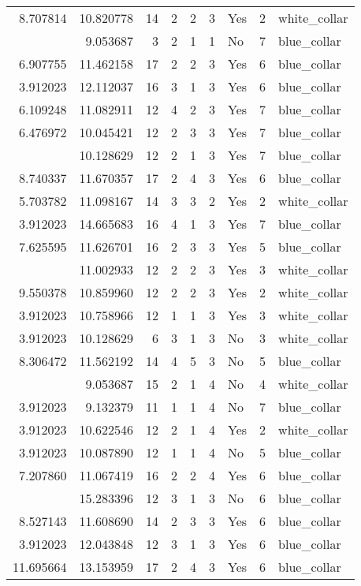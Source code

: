\documentclass[
]{article}
\begin{document}
\begin{longtable}[t]{rrrrrllrl}
8.707814 & 10.820778 & 14 & 2 & 2 & 3 & Yes & 2 & white\_collar\\
\addlinespace
3.912023 & 9.053687 & 3 & 2 & 1 & 1 & No & 7 & blue\_collar\\
6.907755 & 11.462158 & 17 & 2 & 2 & 3 & Yes & 6 & blue\_collar\\
3.912023 & 12.112037 & 16 & 3 & 1 & 3 & Yes & 6 & blue\_collar\\
6.109248 & 11.082911 & 12 & 4 & 2 & 3 & Yes & 7 & blue\_collar\\
6.476972 & 10.045421 & 12 & 2 & 3 & 3 & Yes & 7 & blue\_collar\\
\addlinespace
3.912023 & 10.128629 & 12 & 2 & 1 & 3 & Yes & 7 & blue\_collar\\
8.740337 & 11.670357 & 17 & 2 & 4 & 3 & Yes & 6 & blue\_collar\\
5.703782 & 11.098167 & 14 & 3 & 3 & 2 & Yes & 2 & white\_collar\\
3.912023 & 14.665683 & 16 & 4 & 1 & 3 & Yes & 7 & blue\_collar\\
7.625595 & 11.626701 & 16 & 2 & 3 & 3 & Yes & 5 & blue\_collar\\
\addlinespace
10.045421 & 11.002933 & 12 & 2 & 2 & 3 & Yes & 3 & white\_collar\\
9.550378 & 10.859960 & 12 & 2 & 2 & 3 & Yes & 2 & white\_collar\\
3.912023 & 10.758966 & 12 & 1 & 1 & 3 & Yes & 3 & white\_collar\\
3.912023 & 10.128629 & 6 & 3 & 1 & 3 & No & 3 & white\_collar\\
8.306472 & 11.562192 & 14 & 4 & 5 & 3 & No & 5 & blue\_collar\\
\addlinespace
3.912023 & 9.053687 & 15 & 2 & 1 & 4 & No & 4 & white\_collar\\
3.912023 & 9.132379 & 11 & 1 & 1 & 4 & No & 7 & blue\_collar\\
3.912023 & 10.622546 & 12 & 2 & 1 & 4 & Yes & 2 & white\_collar\\
3.912023 & 10.087890 & 12 & 1 & 1 & 4 & No & 5 & blue\_collar\\
7.207860 & 11.067419 & 16 & 2 & 2 & 4 & Yes & 6 & blue\_collar\\
\addlinespace
3.912023 & 15.283396 & 12 & 3 & 1 & 3 & No & 6 & blue\_collar\\
8.527143 & 11.608690 & 14 & 2 & 3 & 3 & Yes & 6 & blue\_collar\\
3.912023 & 12.043848 & 12 & 3 & 1 & 3 & Yes & 6 & blue\_collar\\
11.695664 & 13.153959 & 17 & 2 & 4 & 3 & Yes & 6 & blue\_collar\\

\end{longtable}
\end{document}
